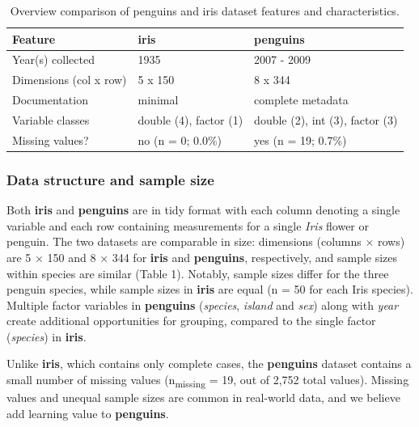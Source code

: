 \begin{Schunk}
\begin{table}

\caption{\label{tab:unnamed-chunk-1}Overview comparison of penguins and iris dataset features and characteristics.}
\centering
\begin{tabular}[t]{l|l|l}
\hline
Feature & iris & penguins\\
\hline
Year(s) collected & 1935 & 2007 - 2009\\
\hline
Dimensions (col x row) & 5 x 150 & 8 x 344\\
\hline
Documentation & minimal & complete metadata\\
\hline
Variable classes & double (4), factor (1) & double (2), int (3), factor (3)\\
\hline
Missing values? & no (n = 0; 0.0\%) & yes (n = 19; 0.7\%)\\
\hline
\end{tabular}
\end{table}

\end{Schunk}

\hypertarget{data-structure-and-sample-size}{%
\subsubsection{Data structure and sample
size}\label{data-structure-and-sample-size}}

Both \textbf{iris} and \textbf{penguins} are in tidy format
\citep{wickham_tidy_2014} with each column denoting a single variable
and each row containing measurements for a single \emph{Iris} flower or
penguin. The two datasets are comparable in size: dimensions (columns ×
rows) are 5 × 150 and 8 × 344 for \textbf{iris} and \textbf{penguins},
respectively, and sample sizes within species are similar (Table 1).
Notably, sample sizes differ for the three penguin species, while sample
sizes in \textbf{iris} are equal (n = 50 for each Iris species).
Multiple factor variables in \textbf{penguins} (\emph{species},
\emph{island} and \emph{sex}) along with \emph{year} create additional
opportunities for grouping, compared to the single factor
(\emph{species}) in \textbf{iris}.

Unlike \textbf{iris}, which contains only complete cases, the
\textbf{penguins} dataset contains a small number of missing values
(n\textsubscript{missing} = 19, out of 2,752 total values). Missing
values and unequal sample sizes are common in real-world data, and we
believe add learning value to \textbf{penguins}.

